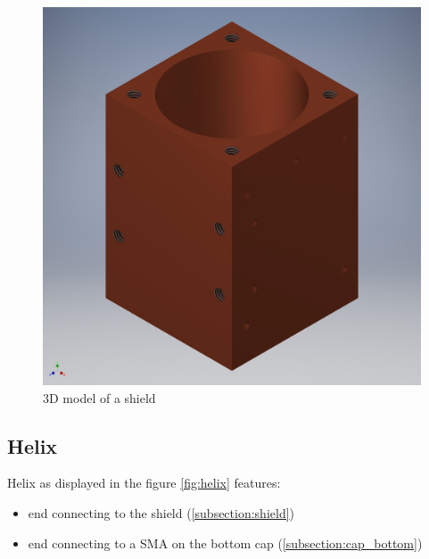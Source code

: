 \begin{figure}[h]
	\centering
	\includegraphics[width=\textwidth]{images/shield}
	\caption{3D model of a shield}
	\label{fig:shield}
\end{figure}

\clearpage
\subsection{Helix}
\label{subsection:helix}
Helix as displayed in the figure \ref{fig:helix} features:
\begin{itemize}
	\item end connecting to the shield (\ref{subsection:shield})
	\item end connecting to a SMA on the bottom cap (\ref{subsection:cap_bottom})
\end{itemize}

